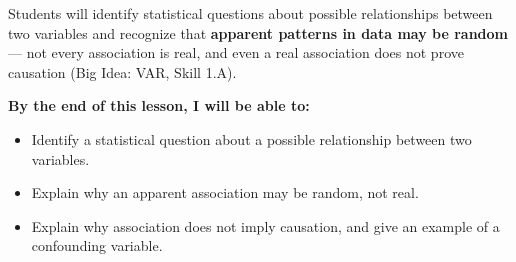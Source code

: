 \documentclass[aspectratio=169, 11pt]{beamer}
\begin{document}
{
\begin{frame}[t, plain]
  \vspace{0.45cm}\par
  \hspace{0.55cm}%
  \begin{minipage}{0.9\textwidth}


    \normalsize
    Students will identify statistical questions about possible relationships
    between two variables and recognize that \textbf{apparent patterns in data
    may be random} --- not every association is real, and even a real association
    does not prove causation (Big Idea: VAR, Skill 1.A).

    \vspace{0.6cm}

    \normalsize\textbf{\color{navy}By the end of this lesson, I will be able to:}

    \smallskip
    \begin{itemize}
      \setlength{\itemsep}{0.3em}\setlength{\topsep}{0.2em}
      \item Identify a statistical question about a possible relationship between
        two variables.
      \item Explain why an apparent association may be random, not real.
      \item Explain why association does not imply causation, and give an example
        of a confounding variable.
    \end{itemize}

  \end{minipage}
\end{frame}
}
\end{document}
